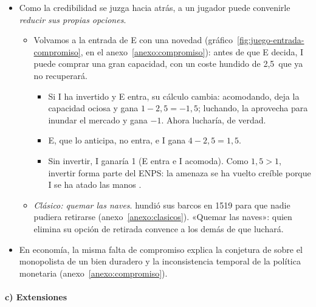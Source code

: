 \documentclass[11pt]{article}
\begin{document}
\begin{itemize}
\item Como la credibilidad se juzga hacia atrás, a un jugador puede convenirle \emph{reducir sus propias opciones}\nocite{Schelling1960Strategy}.
  \begin{itemize}
  \item Volvamos a la entrada de E con una novedad (gráfico~\ref{fig:juego-entrada-compromiso}, en el anexo~\ref{anexo:compromiso}): antes de que E decida, \textup{I} puede comprar una gran capacidad, con un coste hundido de 2,5~que ya no recuperará.
    \begin{itemize}
    \item Si \textup{I} ha invertido y E entra, su cálculo cambia: acomodando, deja la capacidad ociosa y gana $1-2{,}5=-1{,}5$; luchando, la aprovecha para inundar el mercado y gana $-1$. Ahora lucharía, de verdad.
    \item E, que lo anticipa, no entra, e \textup{I} gana $4-2{,}5=1{,}5$.
    \item Sin invertir, \textup{I} ganaría 1 (E entra e \textup{I} acomoda). Como $1{,}5>1$, invertir forma parte del ENPS: la amenaza se ha vuelto creíble porque \textup{I} se ha atado las manos\nocite{Spence1977Entry,Dixit1980Role} .
    \end{itemize}
  \item \emph{Clásico: quemar las naves}.  hundió sus barcos en 1519 para que nadie pudiera retirarse (anexo~\ref{anexo:clasicos}). «Quemar las naves»: quien elimina su opción de retirada convence a los demás de que luchará.
  \end{itemize}
\item En economía, la misma falta de compromiso explica la conjetura de  sobre el monopolista de un bien duradero  y la inconsistencia temporal de la política monetaria  (anexo~\ref{anexo:compromiso}).
\end{itemize}

\paragraph{c) Extensiones}
\end{document}
